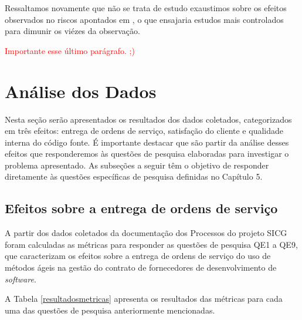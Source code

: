 Ressaltamos novamente que não se trata de estudo exaustimos sobre os efeitos observados no riscos apontados em , o que ensajaria estudos mais controlados para dimunir os viézes da observação.

\textcolor{red}{Importante esse último parágrafo. ;) }


\section[Análise dos Dados]{Análise dos Dados}

Nesta seção serão apresentados os resultados dos dados coletados, categorizados em três efeitos: entrega de ordens de serviço, satisfação do cliente e qualidade interna do código fonte. É importante destacar que são partir da análise desses efeitos que responderemos às questões de pesquisa elaboradas para investigar o problema apresentado. As subseções a seguir têm o objetivo de responder diretamente às questões específicas de pesquisa definidas no Capítulo 5.

\subsection[Efeitos sobre a entrega de ordens de serviço]{Efeitos sobre a entrega de ordens de serviço}

A partir dos dados coletados da documentação dos Processos do projeto SICG foram calculadas as métricas para responder as questões de pesquisa QE1 a QE9, que caracterizam os efeitos sobre a entrega de ordens de serviço do uso de métodos ágeis na gestão do contrato de fornecedores de desenvolvimento de \textit{software}.

A Tabela \ref{resultadosmetricas} apresenta os resultados das métricas para cada uma das questões de pesquisa anteriormente mencionadas.

